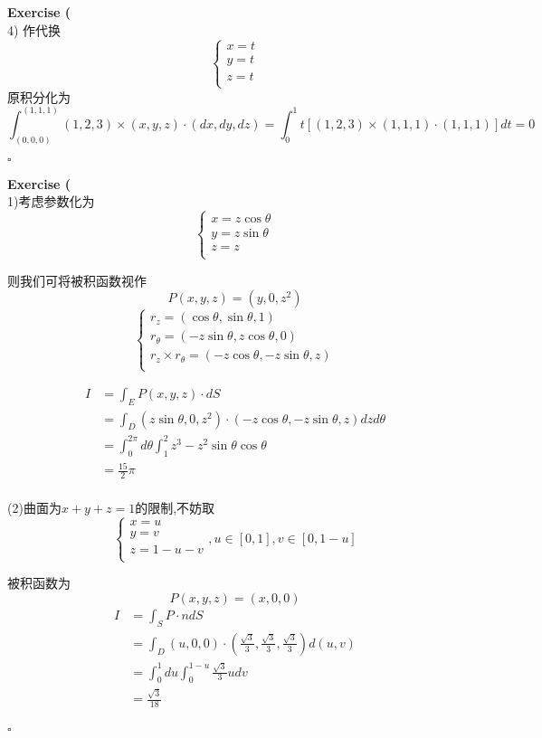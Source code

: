 \documentclass[11pt,hyperref,a4paper,UTF8]{ctexart}
\newenvironment{exercise}[1]{%
{\textbf{Exercise #1} \\ 
    }
}{
  \hfill $\square$ 
  \par\bigskip 
}
\newcommand{\parameter}[1]{\left(#1\right)}
\newcommand{\bracket}[1]{\left[#1\right]}
\begin{document}
\begin{CJK}{UTF8}{gkai}
\begin{exercise}{14}
    (4)
    作代换
    \[
    \begin{cases}
        x = t\\
        y = t\\
        z = t\\
    \end{cases}\]
    原积分化为
    \[\int_{(0,0,0)}^{(1,1,1)} (1,2,3)\times (x,y,z) \cdot (dx,dy,dz) = \int_{0}^{1} t\bracket{(1,2,3)\times (1,1,1) \cdot (1,1,1)} dt = 0\]
\end{exercise}

\begin{exercise}{15}
    (1)考虑参数化为
    \[\begin{cases}
        x = z\cos \theta\\
        y = z\sin \theta\\
        z = z\\
    \end{cases}\]

    则我们可将被积函数视作
    \[P(x,y,z) = (y,0,z^2)\]
    \[\begin{cases}
        r_z = (\cos \theta,\sin \theta,1)\\
        r_\theta = (-z\sin \theta,z \cos \theta,0)\\
        r_z \times r_\theta = (-z\cos \theta,-z \sin \theta,z)\\
    \end{cases}\]

    \[
        \begin{aligned}    
            I &= \int_E P(x,y,z) \cdot d S\\
            &= \int_D (z \sin \theta,0,z^2) \cdot (-z\cos \theta,-z \sin \theta,z) dz d\theta\\
            &= \int_{0}^{2\pi} d\theta \int_{1}^{2} z^3 - z^2\sin\theta \cos \theta\\
            &= \frac{15}{2}\pi\\
        \end{aligned}
        \]

    (2)曲面为$x + y + z = 1$的限制,不妨取
    \[\begin{cases}
        x = u\\
        y = v\\
        z = 1 - u - v\\
    \end{cases},u \in [0,1],v \in [0, 1 - u]\]

    被积函数为
    \[P(x,y,z) = (x,0,0)\]
    \[
    \begin{aligned}
        I &= \int_S P \cdot n dS\\ 
        &= \int_D (u,0,0) \cdot \parameter{\frac{\sqrt{3}}{3},\frac{\sqrt{3}}{3},\frac{\sqrt{3}}{3}} d(u,v)\\
        &= \int_0^1 du \int_{0}^{1 - u} \frac{\sqrt{3}}{3}u dv\\
        &= \frac{\sqrt{3}}{18}\\
    \end{aligned}    
    \]
\end{exercise}


\end{CJK}
\end{document}

